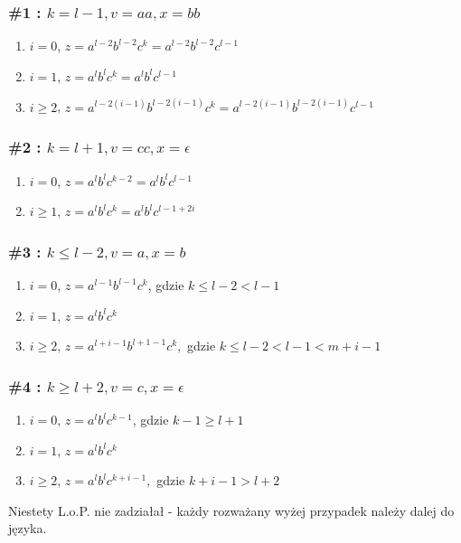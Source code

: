 \documentclass{article}
\begin{document}
\subsubsection*{\#1 : $k = l - 1, v = aa, x = bb$}
\begin{enumerate}
\item $i=0$, $z = a^{l-2}b^{l-2}c^k = a^{l-2}b^{l-2}c^{l-1}$
\item $i=1$, $z = a^{l}b^{l}c^k = a^{l}b^{l}c^{l-1}$
\item $i\geq2$, $z = a^{l-2(i-1)}b^{l-2(i-1)}c^k = a^{l-2(i-1)}b^{l-2(i-1)}c^{l-1}$
\end{enumerate}
\subsubsection*{\#2 : $k = l + 1, v = cc, x = \epsilon$}
\begin{enumerate}
\item $i=0$, $z = a^{l}b^{l}c^{k-2} = a^{l}b^{l}c^{l-1}$
\item $i\geq1$, $z = a^{l}b^{l}c^k = a^{l}b^{l}c^{l-1+2i}$
\end{enumerate}
\subsubsection*{\#3 : $k \leq l - 2, v = a, x = b$}
\begin{enumerate}
\item $i=0$, $z = a^{l-1}b^{l-1}c^k$, gdzie $k \leq l - 2 < l - 1$
\item $i=1$, $z = a^{l}b^{l}c^k$
\item $i\geq2$, $z = a^{l+i-1}b^{l+1-1}c^k,$ gdzie $k \leq l - 2 < l - 1 < m + i - 1$
\end{enumerate}
\subsubsection*{\#4 : $k \geq l + 2, v = c, x = \epsilon$}
\begin{enumerate}
\item $i=0$, $z = a^{l}b^{l}c^{k-1}$, gdzie $k - 1 \geq l + 1$
\item $i=1$, $z = a^{l}b^{l}c^k$
\item $i\geq2$, $z = a^{l}b^{l}c^{k+i-1},$ gdzie $k + i - 1 > l + 2$
\end{enumerate}

Niestety L.o.P. nie zadziałał - każdy rozważany wyżej przypadek należy dalej do języka.\\
\end{document}
